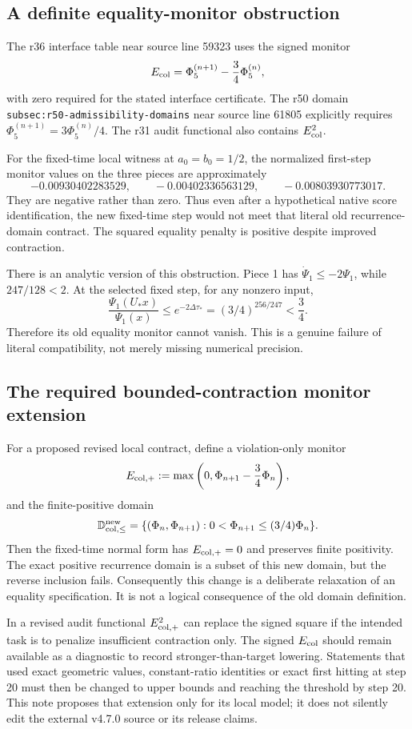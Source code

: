 \documentclass[11pt,a4paper]{article}
\begin{document}
\subsection{A definite equality-monitor obstruction}
The r36 interface table near source line 59323 uses the signed monitor
\[
E_{\rm col}=\Phi_5^{(n+1)}-\frac34\Phi_5^{(n)},
\]
with zero required for the stated interface certificate. The r50 domain
\texttt{subsec:r50-admissibility-domains} near source line 61805 explicitly
requires $\Phi_5^{(n+1)}=3\Phi_5^{(n)}/4$. The r31 audit functional also
contains $E_{\rm col}^2$.

For the fixed-time local witness at $a_0=b_0=1/2$, the normalized first-step
monitor values on the three pieces are approximately
\[
-0.00930402283529,\qquad -0.00402336563129,\qquad -0.00803930773017.
\]
They are negative rather than zero. Thus even after a hypothetical native
score identification, the new fixed-time step would not meet that literal
old recurrence-domain contract. The squared equality penalty is positive
despite improved contraction.

There is an analytic version of this obstruction. Piece 1 has
$\dot\Psi_1\le-2\Psi_1$, while $247/128<2$. At the selected fixed step,
for any nonzero input,
\[
\frac{\Psi_1(U_*x)}{\Psi_1(x)}
\le e^{-2\Delta\tau_*}
=(3/4)^{256/247}<\frac34.
\]
Therefore its old equality monitor cannot vanish. This is a genuine failure
of literal compatibility, not merely missing numerical precision.

\subsection{The required bounded-contraction monitor extension}
For a proposed revised local contract, define a violation-only monitor
\[
E_{{\rm col},+}:=\max\left(0,
\Phi_{n+1}-\frac34\Phi_n\right),
\]
and the finite-positive domain
\[
\mathbb D_{{\rm col},\le}^{\rm new}
=\{(\Phi_n,\Phi_{n+1}):0<\Phi_{n+1}\le(3/4)\Phi_n\}.
\]
Then the fixed-time normal form has $E_{{\rm col},+}=0$ and preserves
finite positivity. The exact positive recurrence domain is a subset of
this new domain, but the reverse inclusion fails. Consequently this
change is a deliberate relaxation of an equality specification. It is
not a logical consequence of the old domain definition.

In a revised audit functional $E_{{\rm col},+}^2$ can replace the signed
square if the intended task is to penalize insufficient contraction only.
The signed $E_{\rm col}$ should remain available as a diagnostic to record
stronger-than-target lowering. Statements that used exact geometric values,
constant-ratio identities or exact first hitting at step 20 must then be
changed to upper bounds and reaching the threshold by step 20.
This note proposes that extension only for its local model; it does not
silently edit the external v4.7.0 source or its release claims.
\end{document}
